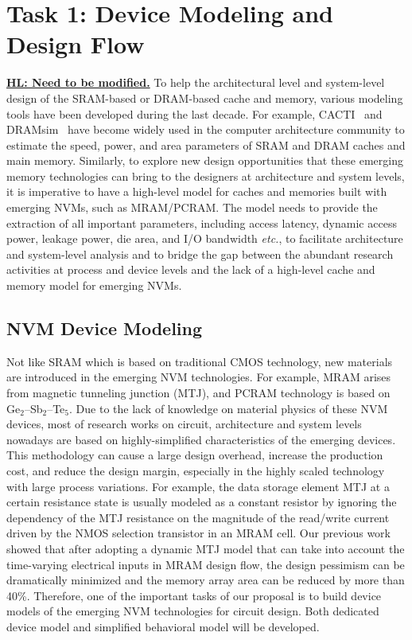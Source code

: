 
\section{Task 1: Device Modeling and Design Flow}

\textbf{\underline{HL: Need to be modified.}}
To help the architectural level and system-level design of
the SRAM-based or DRAM-based cache and memory, various
modeling tools have been developed during the last decade. For
example, CACTI~\cite{CACTI:NORM,PRAM:EVANS,PRAM:eCACTI,PRAM:CACTI60} and
DRAMsim~\cite{DRAMsim} have become widely used in the
computer architecture community to estimate the speed, power, and
area parameters of SRAM and DRAM caches and main memory.
Similarly, to explore new design opportunities that these emerging
memory technologies can bring to the designers at architecture and
system levels, it is imperative to have a high-level model
for caches and memories built with emerging NVMs, such as MRAM/PCRAM.
The model needs to provide the extraction of all important parameters, including access latency, dynamic access power, leakage power, die area, and I/O bandwidth \emph{etc.}, to facilitate architecture and system-level analysis and to bridge the gap between the abundant research activities at process and device levels and the lack of a high-level cache and memory model for emerging NVMs.

\subsection{NVM Device Modeling}

Not like SRAM which is based on traditional CMOS technology, new materials are introduced in the emerging NVM technologies. For example, MRAM arises from magnetic tunneling junction (MTJ), and PCRAM technology is based on Ge$_2$--Sb$_2$--Te$_5$. 
Due to the lack of knowledge on material physics of these NVM devices, most of research works on circuit, architecture and system levels nowadays are based on highly-simplified characteristics of the emerging devices. This methodology can cause a large design overhead, increase the production cost, and reduce the design margin, especially in the highly scaled technology with large process variations.  For example, the data storage element MTJ at a certain resistance state is usually modeled as a constant resistor by ignoring the dependency of the MTJ resistance on the magnitude of the read/write current driven by the NMOS selection transistor in an MRAM cell. Our previous work~\cite{Chen08} showed that after adopting a dynamic MTJ model that can take into account the time-varying electrical inputs in MRAM design flow, the design pessimism can be dramatically minimized and the memory array area can be reduced by more than 40\%. Therefore, one of the important tasks of our proposal is to build device models of the emerging NVM technologies for circuit design. Both dedicated device model and simplified behavioral model will be developed.

